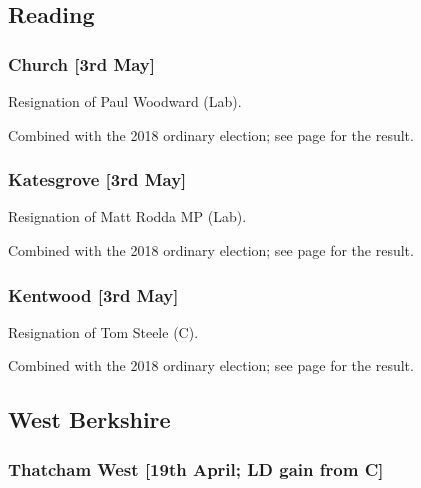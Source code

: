 \documentclass[a4paper,openany]{book}
\begin{document}
\begin{resultsiii}
\subsection*{Reading}

\subsubsection*{Church \hspace*{\fill}\nolinebreak[1]%
\enspace\hspace*{\fill}
[3rd May]}


Resignation of Paul Woodward (Lab).

Combined with the 2018 ordinary election; see page \pageref{ChurchReading} for the result.

\subsubsection*{Katesgrove \hspace*{\fill}\nolinebreak[1]%
\enspace\hspace*{\fill}
[3rd May]}


Resignation of Matt Rodda MP (Lab).

Combined with the 2018 ordinary election; see page \pageref{KatesgroveReading} for the result.

\subsubsection*{Kentwood \hspace*{\fill}\nolinebreak[1]%
\enspace\hspace*{\fill}
[3rd May]}


Resignation of Tom Steele (C).

Combined with the 2018 ordinary election; see page \pageref{KentwoodReading} for the result.

\subsection*{West Berkshire}

\subsubsection*{Thatcham West \hspace*{\fill}\nolinebreak[1]%
\enspace\hspace*{\fill}
[19th April; LD gain from C]}


\end{resultsiii}
\end{document}
